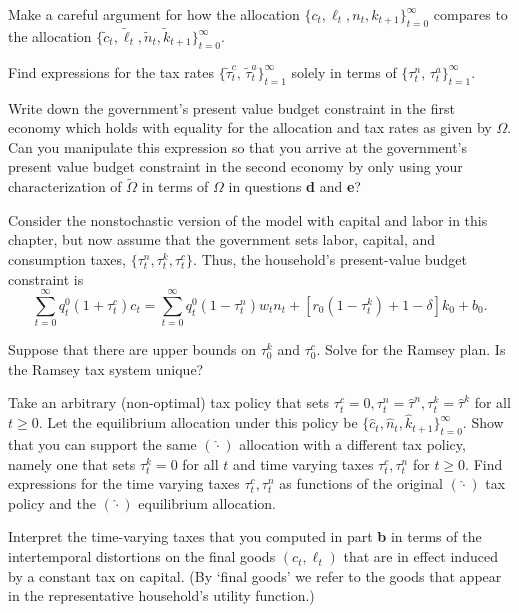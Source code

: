 \medskip
{} Make a careful argument for how the allocation
$\{c_t, \ell_t, n_t, k_{t+1}\}_{t=0}^\infty$ compares
to the allocation $\{\tilde c_t, \tilde \ell_t, \tilde n_t,
\tilde k_{t+1}\}_{t=0}^\infty$.

\medskip
{} Find expressions for the tax rates
$\{\tilde \tau^c_t, \,\tilde \tau^a_t\}_{t=1}^\infty$
solely in terms of
$\{\tau^n_t, \,\tau^a_t\}_{t=1}^\infty$.


\medskip
{} Write down the government's present
value budget constraint in the first economy which holds with
equality for the allocation and tax rates as given by
$\Omega$. Can you manipulate this expression so that
you arrive at the government's present value budget constraint in
the second economy by only using
your characterization of $\tilde \Omega$
in terms of $\Omega$ in questions {\bf d} and {\bf e}?



\medskip
{}

\medskip
\noindent
Consider the nonstochastic version of the model with capital and labor in this
chapter, but now assume that the
government sets labor, capital, and consumption taxes, $\{\tau^n_t, \tau^k_t, \tau^c_t\}$.
Thus, the household's present-value budget constraint is
$$
\sum_{t=0}^\infty q^0_t (1+\tau^c_t) c_t =
\sum_{t=0}^\infty q^0_t (1-\tau^n_t) w_t n_t
   + \left[r_{0}(1-\tau^k_t) + 1-\delta \right] k_0 + b_0.
$$

\medskip
{} Suppose that there are upper bounds on $\tau^k_0$ and $\tau^c_0$. Solve for the Ramsey plan.  Is the Ramsey tax system
unique?

\medskip
{} Take an arbitrary (non-optimal) tax policy that sets $\tau^c_t = 0, \tau^n_t = \hat \tau^n, \tau^k_t = \hat \tau^k$
for all $t \geq 0$.  Let the equilibrium allocation under this policy be $\{\hat c_t, \hat n_t, \hat k_{t+1}\}_{t=0}^\infty$.
Show that you can support the same $(\hat \cdot)$ allocation with a  different tax policy, namely one that sets  $\tau^k_t =0 $ for all $t$ and time varying
taxes $\tau^c_t, \tau^n_t$ for $t \geq 0$.    Find expressions for the time varying taxes $\tau^c_t, \tau^n_t$ as functions of the original $(\hat \cdot)$
tax policy and the $(\hat \cdot)$  equilibrium allocation.

\medskip
{} Interpret the time-varying taxes that you computed in part {\bf b} in terms of the intertemporal distortions
on the final goods $(c_t, \ell_t)$  that are in effect  induced
by a constant tax on capital. (By `final goods' we refer to the goods that appear in the representative household's utility function.)


